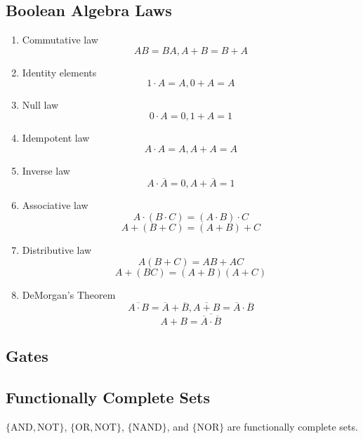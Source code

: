 \documentclass[11pt,a4paper]{article}
\begin{document}
\subsection{Boolean Algebra Laws}
\begin{enumerate}
    \item [1. ] Commutative law
        \[
        AB = BA, A + B = B + A
        \]

    \item [2. ] Identity elements
        \[
        1 \cdot A = A, 0 + A = A
        \]

    \item [3. ] Null law
        \[
        0 \cdot A = 0, 1 + A = 1
        \]
    
    \item [4. ] Idempotent law 
        \[
        A \cdot A = A, A + A = A
        \]
    
    \item [5. ] Inverse law
        \[
        A \cdot \overline{A} = 0, A + \overline{A} = 1
        \]
    
    \item [6. ] Associative law
        \[
        A \cdot (B \cdot C) = (A \cdot B) \cdot C
        \]
        \[
        A + (B + C) = (A + B) + C
        \]
    
    \item [7. ] Distributive law
        \[
        A (B + C) = AB + AC
        \]
        \[
        A + (BC) = (A + B)(A + C)
        \]

    \item [8.] DeMorgan's Theorem
        \[
        \overline{A \cdot B} = \overline{A} + \overline{B}, \overline{A + B} = \overline{A} \cdot \overline{B}
        \]
        \[
        A + B = \overline{\overline{A} \cdot \overline{B}}
        \]

\end{enumerate}

\subsection{Gates}

\subsection{Functionally Complete Sets}
$\{\text{AND}, \text{NOT}\}$, $\{\text{OR}, \text{NOT}\}$, $\{\text{NAND}\}$, and $\{\text{NOR}\}$ are functionally complete sets.
\end{document}
